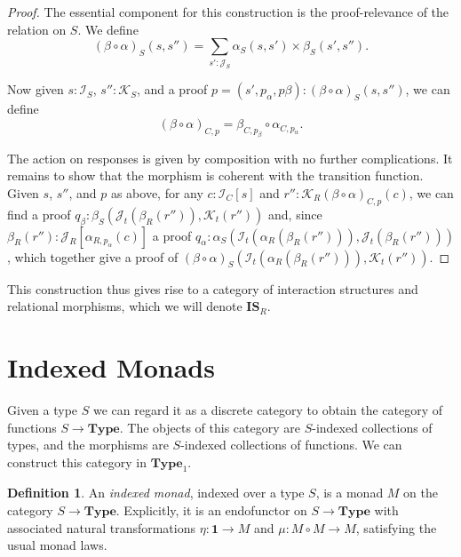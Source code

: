 \documentclass{article}
\theoremstyle{definition}
\newtheorem{definition}[theorem]{Definition}
\newcommand{\iss}[1]{\mathcal{#1}_S}
\newcommand{\isc}[1]{\mathcal{#1}_C}
\newcommand{\isr}[1]{\mathcal{#1}_R}
\newcommand{\ist}[1]{\mathcal{#1}_t}
\begin{document}
    \begin{proof}
        The essential component for this construction is the proof-relevance of the relation on $S$.  We define
        \[
            (\beta \circ \alpha)_S(s, s'') = \sum_{s' : \iss J} \alpha_S(s, s') \times \beta_S(s', s'').
        \]

        Now given $s : \iss I$, $s'' : \iss K$, and a proof $p = (s', p_\alpha, p\beta) : (\beta \circ \alpha)_S(s, s'')$,
        we can define
        \[
            (\beta \circ \alpha)_{C, p} = \beta_{C, p_\beta} \circ \alpha_{C, p_\alpha}.
        \]

        The action on responses is given by composition with no further complications.  It remains to show that the
        morphism is coherent with the transition function.  Given $s$, $s''$, and $p$ as above, for any $c : \isc I[s]$
        and $r'' : \isr K{(\beta \circ \alpha)_{C, p}(c)}$, we can find a proof $q_\beta : \beta_S(\ist J(\beta_R(r'')),
        \ist K(r''))$ and, since $\beta_R(r'') : \isr J[\alpha_{R, p_\alpha}(c)]$ a proof $q_\alpha :
        \alpha_S(\ist I(\alpha_R(\beta_R(r''))), \ist J(\beta_R(r'')))$, which together give a proof of $(\beta \circ
        \alpha)_S(\ist I(\alpha_R(\beta_R(r''))), \ist K(r''))$.
    \end{proof}

    This construction thus gives rise to a category of interaction structures and relational morphisms, which we will
    denote $\mathbf{IS}_R$.

    \section{Indexed Monads}

    Given a type $S$ we can regard it as a discrete category to obtain the category of functions $S \to \mathbf{Type}$.
    The objects of this category are $S$-indexed collections of types, and the morphisms are $S$-indexed collections of
    functions.  We can construct this category in $\mathbf{Type}_1$.

    \begin{definition}
        An \emph{indexed monad}, indexed over a type $S$, is a monad $M$ on the category $S \to \mathbf{Type}$.
        Explicitly, it is an endofunctor on $S \to \mathbf{Type}$ with associated natural transformations $\eta :
        \mathbf{1} \to M$ and $\mu : M \circ M \to M$, satisfying the usual monad laws.
    \end{definition}
\end{document}
